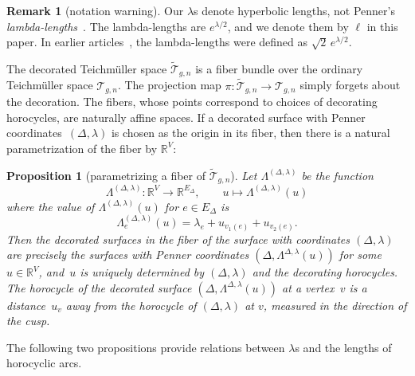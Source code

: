 \documentclass[a4paper, 11pt]{article}
\newcommand{\R}{\mathbb{R}}
\newcommand{\Teich}{\mathcal{T}}
\newcommand{\decTeich}{\widetilde{\Teich}}
\newcommand{\Tm}{Teich\-m{\"u}l\-ler}
\theoremstyle{plain}
\newtheorem{proposition}[theorem]{Proposition}
\theoremstyle{definition}
\newtheorem{remark}[theorem]{Remark}
\begin{document}
\begin{remark}[notation warning]
  \label{rem:notation}
  Our $\lambda$s denote hyperbolic lengths, not
  Penner's \emph{lambda-lengths}~\cite{penner12}. The lambda-lengths
  are $e^{\lambda/2}$, and we denote them by $\ell$ in this paper. In
  earlier articles~\cite{penner87}, the lambda-lengths were defined as
  $\sqrt{2}\,e^{\lambda/2}$.
\end{remark}

The decorated {\Tm} space $\decTeich_{g,n}$ is a fiber bundle over the
ordinary {\Tm} space $\Teich_{g,n}$. The projection map
$\pi:\decTeich_{g,n}\rightarrow\Teich_{g,n}$ simply forgets about the
decoration. The fibers, whose points correspond to choices of
decorating horocycles, are naturally affine spaces. If a decorated
surface with Penner coordinates~$(\Delta,\lambda)$ is chosen as the
origin in its fiber, then there is a natural parametrization of the
fiber by $\R^{V}$:

\begin{proposition}[parametrizing a fiber of $\decTeich_{g,n}$]
  \label{prop:fiber}
  Let $\Lambda^{(\Delta,\lambda)}$ be the function
  \begin{equation*}
    \Lambda^{(\Delta,\lambda)}:
    \R^{V}\longrightarrow\R^{E_{\Delta}},
    \qquad
    u\longmapsto \Lambda^{(\Delta,\lambda)}(u)
  \end{equation*}
  where the value of $\Lambda^{(\Delta,\lambda)}(u)$ for
  $e\in E_{\Delta}$ is
  \begin{equation}
    \label{eq:Lambda}
    \Lambda^{(\Delta,\lambda)}_{e}(u)
    =\lambda_{e}+u_{v_{1}(e)}+u_{v_{2}(e)}.
  \end{equation}
  Then the decorated surfaces in the fiber of the surface with
  coordinates $(\Delta,\lambda)$ are precisely the surfaces with
  Penner coordinates $(\Delta,\Lambda^{\Delta,\lambda}(u))$ for some
  $u\in\R^{V}$, and~$u$ is uniquely determined by $(\Delta,\lambda)$
  and the decorating horocycles. The horocycle of the decorated
  surface $(\Delta,\Lambda^{\Delta,\lambda}(u))$ at a vertex~$v$ is a
  distance~$u_{v}$ away from the horocycle of $(\Delta,\lambda)$ at
  $v$, measured in the direction of the cusp.
\end{proposition}

The following two propositions provide relations between $\lambda$s
and the lengths of horocyclic arcs.
\end{document}
